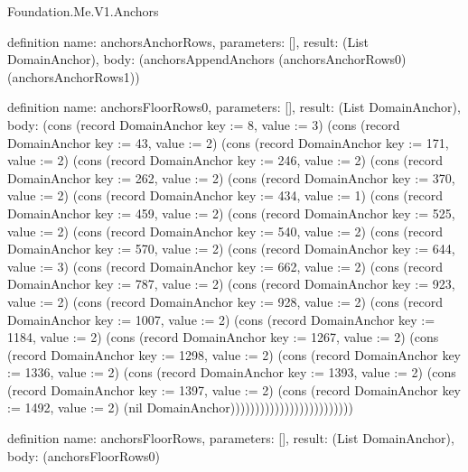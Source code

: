 \begin{lexlean}{Foundation.Me.V1.Anchors}
\begin{semanticmodule}
definition{
  name: anchorsAnchorRows,
  parameters: [],
  result: (List DomainAnchor),
  body: (anchorsAppendAnchors (anchorsAnchorRows0) (anchorsAnchorRows1))
}

definition{
  name: anchorsFloorRows0,
  parameters: [],
  result: (List DomainAnchor),
  body: (cons (record DomainAnchor {key := 8, value := 3}) (cons (record DomainAnchor {key := 43, value := 2}) (cons (record DomainAnchor {key := 171, value := 2}) (cons (record DomainAnchor {key := 246, value := 2}) (cons (record DomainAnchor {key := 262, value := 2}) (cons (record DomainAnchor {key := 370, value := 2}) (cons (record DomainAnchor {key := 434, value := 1}) (cons (record DomainAnchor {key := 459, value := 2}) (cons (record DomainAnchor {key := 525, value := 2}) (cons (record DomainAnchor {key := 540, value := 2}) (cons (record DomainAnchor {key := 570, value := 2}) (cons (record DomainAnchor {key := 644, value := 3}) (cons (record DomainAnchor {key := 662, value := 2}) (cons (record DomainAnchor {key := 787, value := 2}) (cons (record DomainAnchor {key := 923, value := 2}) (cons (record DomainAnchor {key := 928, value := 2}) (cons (record DomainAnchor {key := 1007, value := 2}) (cons (record DomainAnchor {key := 1184, value := 2}) (cons (record DomainAnchor {key := 1267, value := 2}) (cons (record DomainAnchor {key := 1298, value := 2}) (cons (record DomainAnchor {key := 1336, value := 2}) (cons (record DomainAnchor {key := 1393, value := 2}) (cons (record DomainAnchor {key := 1397, value := 2}) (cons (record DomainAnchor {key := 1492, value := 2}) (nil DomainAnchor)))))))))))))))))))))))))
}

definition{
  name: anchorsFloorRows,
  parameters: [],
  result: (List DomainAnchor),
  body: (anchorsFloorRows0)
}
\end{semanticmodule}
\end{lexlean}
